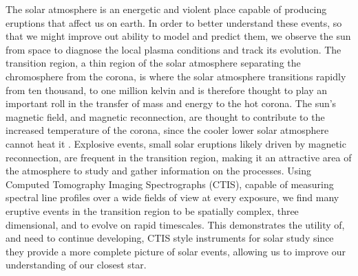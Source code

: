 The solar atmosphere is an energetic and violent place capable of producing eruptions that affect us on earth.
In order to better understand these events, so that we might improve out ability to model and predict them, we observe the sun from space to diagnose the local plasma conditions and track its evolution.
The transition region, a thin region of the solar atmosphere separating the chromosphere from the corona, is where the solar atmosphere transitions rapidly from ten thousand, to one million kelvin and is therefore thought to play an important roll in the transfer of mass and energy to the hot corona.
The sun's magnetic field, and magnetic reconnection, are thought to contribute to the increased temperature of the corona, since the cooler lower solar atmosphere cannot heat it .
Explosive events, small solar eruptions likely driven by magnetic reconnection, are frequent in the transition region, making it an attractive area of the atmosphere to study and gather information on the processes.
Using Computed Tomography Imaging Spectrographs (CTIS), capable of measuring spectral line profiles over a wide fields of view at every exposure, we find many eruptive events in the transition region to be spatially complex, three dimensional, and to evolve on rapid timescales.
This demonstrates the utility of, and need to continue developing, CTIS style instruments for solar study since they provide a more complete picture of solar events, allowing us to improve our understanding of our closest star.

